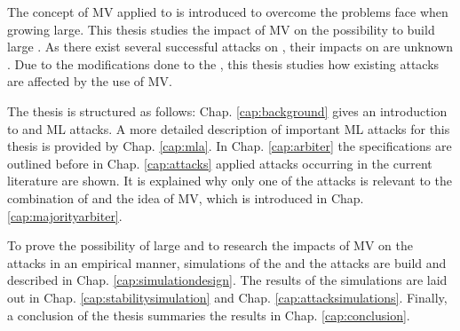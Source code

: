 The concept of \ac{MV} applied to \apufs is introduced to overcome the problems \xpufs face when growing large.
This thesis studies the impact of \ac{MV} on the possibility to build large \xpufs. %
As there exist several successful attacks on \apufs, their impacts on \mpufs are unknown \cite{Ganji2016PACPUFs,Ruhrmair2014PUFOverview}.
Due to the modifications done to the \apuf, this thesis studies how existing attacks are affected by the use of \ac{MV}.

The thesis is structured as follows: 
Chap. \ref{cap:background} gives an introduction to \pufs and \ac{ML} attacks.
A more detailed description of important \ac{ML} attacks for this thesis is provided by Chap. \ref{cap:mla}. %
In Chap. \ref{cap:arbiter} the \apuf specifications are outlined before in Chap. \ref{cap:attacks} applied attacks occurring in the current literature are shown.
It is explained why only one of the attacks is relevant to the combination of \xpufs and the idea of \ac{MV}, which is introduced in Chap. \ref{cap:majorityarbiter}. %

To prove the possibility of large \mxpufs and to research the impacts of \ac{MV} on the attacks in an empirical manner, simulations of the \pufs and the attacks are build and described in Chap. \ref{cap:simulationdesign}. %
The results of the simulations are laid out in Chap. \ref{cap:stabilitysimulation} and Chap. \ref{cap:attacksimulations}.
Finally, a conclusion of the thesis summaries the results in Chap. \ref{cap:conclusion}.

